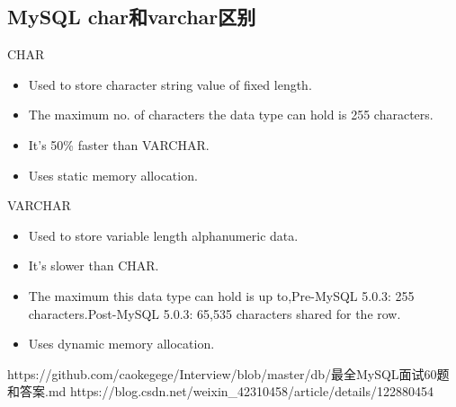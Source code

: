 \documentclass[../../../interview-questions.tex]{subfiles}
\begin{document}
\subsection{MySQL char和varchar区别}

CHAR

\begin{itemize}
    \item {Used to store character string value of fixed length.}
    \item {The maximum no. of characters the data type can hold is 255 characters.}
    \item {It's 50\% faster than VARCHAR.}
    \item {Uses static memory allocation.}
\end{itemize}

VARCHAR

\begin{itemize}
    \item {Used to store variable length alphanumeric data.}
    \item {It's slower than CHAR.}
    \item {The maximum this data type can hold is up to},Pre-MySQL 5.0.3: 255 characters.Post-MySQL 5.0.3: 65,535 characters shared for the row.
    \item {Uses dynamic memory allocation.}
\end{itemize}

https://github.com/caokegege/Interview/blob/master/db/最全MySQL面试60题和答案.md
https://blog.csdn.net/weixin\_42310458/article/details/122880454
\end{document}

